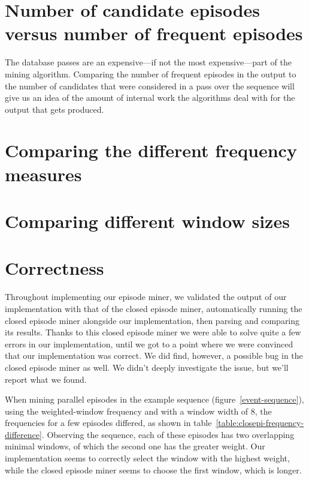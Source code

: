 \section{Number of candidate episodes versus number of frequent episodes}

The database passes are an expensive---if not the most expensive---part of the mining algorithm. Comparing the number of frequent episodes in the output to the number of candidates that were considered in a pass over the sequence will give us an idea of the amount of internal work the algorithms deal with for the output that gets produced.

\section{Comparing the different frequency measures}

\section{Comparing different window sizes}

\section{Correctness}

Throughout implementing our episode miner, we validated the output of our implementation with that of the closed episode miner, automatically running the closed episode miner alongside our implementation, then parsing and comparing its results. Thanks to this closed episode miner we were able to solve quite a few errors in our implementation, until we got to a point where we were convinced that our implementation was correct. We did find, however, a possible bug in the closed episode miner as well. We didn't deeply investigate the issue, but we'll report what we found.

When mining parallel episodes in the example sequence (figure~\ref{event-sequence}), using the weighted-window frequency and with a window width of 8, the frequencies for a few episodes differed, as shown in table~\ref{table:closepi-frequency-difference}. Observing the sequence, each of these episodes has two overlapping minimal windows, of which the second one has the greater weight. Our implementation seems to correctly select the window with the highest weight, while the closed episode miner seems to choose the first window, which is longer.

